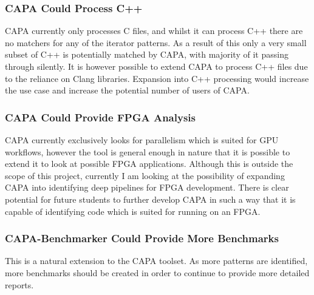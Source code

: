 \subsubsection{CAPA Could Process C++}
CAPA currently only processes C files, and whilst it can process C++ there are no matchers for any
of the iterator patterns. As a result of this only a very small subset of C++ is potentially matched
by CAPA, with majority of it passing through silently. It is however possible to extend CAPA to
process C++ files due to the reliance on Clang libraries. Expansion into C++ processing would
increase the use case and increase the potential number of users of CAPA.

\subsubsection{CAPA Could Provide FPGA Analysis}
CAPA currently exclusively looks for parallelism which is suited for GPU workflows, however the tool
is general enough in nature that it is possible to extend it to look at possible FPGA applications.
Although this is outside the scope of this project, currently I am looking at the possibility of
expanding CAPA into identifying deep pipelines for FPGA development. There is clear potential for
future students to further develop CAPA in such a way that it is capable of identifying code which
is suited for running on an FPGA.

\subsubsection{CAPA-Benchmarker Could Provide More Benchmarks}
This is a natural extension to the CAPA toolset. As more patterns are identified, more benchmarks
should be created in order to continue to provide more detailed reports.


